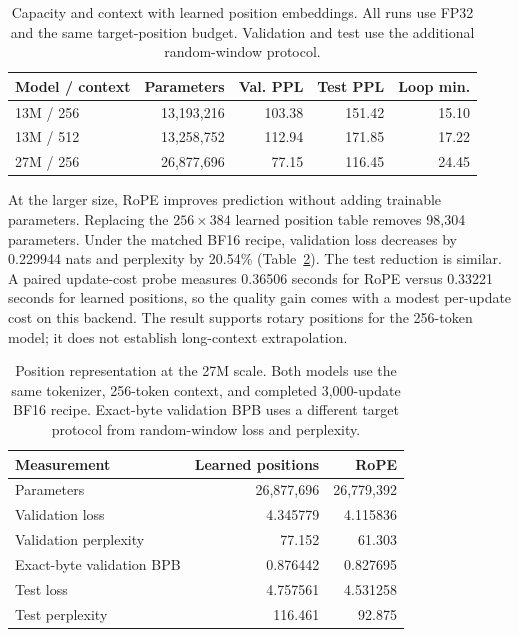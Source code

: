 \documentclass{article}
\begin{document}
\begin{table}[ht]
\caption{Capacity and context with learned position embeddings. All runs use FP32 and the same target-position budget. Validation and test use the additional random-window protocol.}
\label{tab:capacity}\centering\small
\begin{tabular}{lrrrr}
\toprule Model / context & Parameters & Val. PPL & Test PPL & Loop min. \\
\midrule
13M / 256 & 13,193,216 & 103.38 & 151.42 & 15.10 \\
13M / 512 & 13,258,752 & 112.94 & 171.85 & 17.22 \\
27M / 256 & 26,877,696 & 77.15 & 116.45 & 24.45 \\
\bottomrule
\end{tabular}
\end{table}

At the larger size, RoPE improves prediction without adding trainable parameters. Replacing the $256\times384$ learned position table removes 98,304 parameters. Under the matched BF16 recipe, validation loss decreases by 0.229944 nats and perplexity by 20.54\% (Table~\ref{tab:positions}). The test reduction is similar. A paired update-cost probe measures 0.36506 seconds for RoPE versus 0.33221 seconds for learned positions, so the quality gain comes with a modest per-update cost on this backend. The result supports rotary positions for the 256-token model; it does not establish long-context extrapolation.

\begin{table}[ht]
\caption{Position representation at the 27M scale. Both models use the same tokenizer, 256-token context, and completed 3,000-update BF16 recipe. Exact-byte validation BPB uses a different target protocol from random-window loss and perplexity.}
\label{tab:positions}\centering\small
\begin{tabular}{lrr}
\toprule Measurement & Learned positions & RoPE \\
\midrule
Parameters & 26,877,696 & 26,779,392 \\
Validation loss & 4.345779 & 4.115836 \\
Validation perplexity & 77.152 & 61.303 \\
Exact-byte validation BPB & 0.876442 & 0.827695 \\
Test loss & 4.757561 & 4.531258 \\
Test perplexity & 116.461 & 92.875 \\
\bottomrule
\end{tabular}
\end{table}
\end{document}

